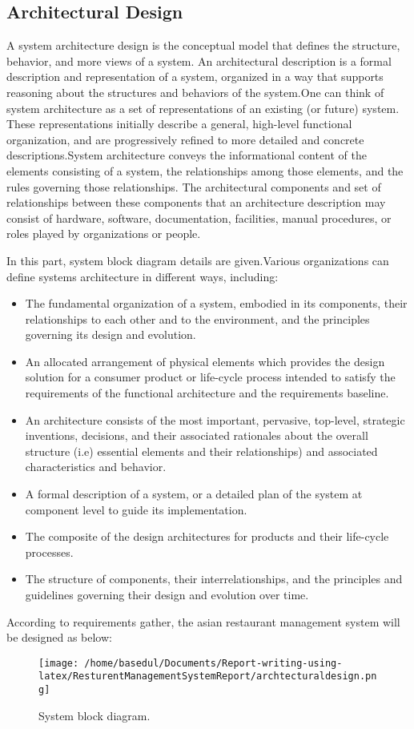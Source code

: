 \documentclass[12pt,a4paper]{article}
\newcommand\tab[1][1cm]{\hspace*{#1}}
\begin{document}
\subsection{Architectural Design}
\tab A system architecture \cite{Ref:12} design is the conceptual model that defines the structure, behavior, and more views of a system. An architectural description is a formal description and representation of a system, organized in a way that supports reasoning about the structures and behaviors of the system.One can think of system architecture as a set of representations of an existing (or future) system. These representations initially describe a general, high-level functional organization, and are progressively refined to more detailed and concrete descriptions.System architecture conveys the informational content of the elements consisting of a system, the relationships among those elements, and the rules governing those relationships. The architectural components and set of relationships between these components that an architecture description may consist of hardware, software, documentation, facilities, manual procedures, or roles played by organizations or people.{In this part, system block diagram details are given.Various organizations can define systems architecture in different ways, including:\begin{itemize}
	\item The fundamental organization of a system, embodied in its components, their relationships to each other and to the environment, and the principles governing its design and evolution.
	\item An allocated arrangement of physical elements which provides the design solution for a consumer product or life-cycle process intended to satisfy the requirements of the functional architecture and the requirements baseline.
	\item An architecture consists of the most important, pervasive, top-level, strategic inventions, decisions, and their associated rationales about the overall structure (i.e) essential elements and their relationships) and associated characteristics and behavior.
	\item A formal description of a system, or a detailed plan of the system at component level to guide its implementation.
	\item The composite of the design architectures for products and their life-cycle processes.
	\item The structure of components, their interrelationships, and the principles and guidelines governing their design and evolution over time.
\end{itemize}According to requirements
gather, the asian restaurant management system will be designed as below:}
	\begin{figure}[H]
		\centering
		\texttt{[image: /home/basedul/Documents/Report-writing-using-latex/ResturentManagementSystemReport/archtecturaldesign.png]}
		\caption{System block diagram.}
		\label{fig:archi} 
	\end{figure}
		
\end{document}

